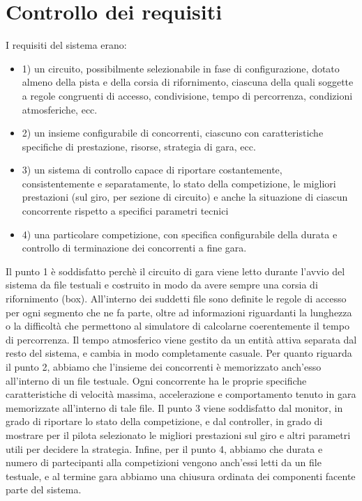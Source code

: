 
\chapter{Controllo dei requisiti} %

\label{Chapter7} %


I requisiti del sistema erano:

\begin{itemize}
 \item 1) un circuito, possibilmente selezionabile in fase di configurazione, dotato almeno della pista e della corsia di rifornimento, ciascuna della quali soggette a regole congruenti di accesso, condivisione, tempo di percorrenza, condizioni atmosferiche, ecc.
 \item 2) un insieme configurabile di concorrenti, ciascuno con caratteristiche specifiche di prestazione, risorse, strategia di gara, ecc.
 \item 3) un sistema di controllo capace di riportare costantemente, consistentemente e separatamente, lo stato della competizione, le migliori prestazioni (sul giro, per sezione di circuito) e anche la situazione di ciascun concorrente rispetto a specifici parametri tecnici
 \item 4) una particolare competizione, con specifica configurabile della durata e controllo di terminazione dei concorrenti a fine gara.
\end{itemize}

Il punto 1 è soddisfatto perchè il circuito di gara viene letto durante l’avvio del sistema da file testuali e costruito in modo da avere sempre una corsia di rifornimento (box). All’interno dei suddetti file sono definite le regole di accesso per ogni segmento che ne fa parte, oltre ad informazioni riguardanti la lunghezza o la difficoltà che permettono al simulatore di calcolarne coerentemente il tempo di percorrenza. Il tempo atmosferico viene gestito da un entità attiva separata dal resto del sistema, e cambia in modo completamente casuale.
Per quanto riguarda il punto 2, abbiamo che l’insieme dei concorrenti è memorizzato anch’esso all’interno di un file testuale. Ogni concorrente ha le proprie specifiche caratteristiche di velocità massima, accelerazione e comportamento tenuto in gara memorizzate all’interno di tale file.
Il punto 3 viene soddisfatto dal monitor, in grado di riportare lo stato della competizione, e dal controller, in grado di mostrare per il pilota selezionato le migliori prestazioni sul giro e altri parametri utili per decidere la strategia.
Infine, per il punto 4, abbiamo che durata e numero di partecipanti alla competizioni vengono anch’essi letti da un file testuale, e al termine gara abbiamo una chiusura ordinata dei componenti facente parte del sistema.